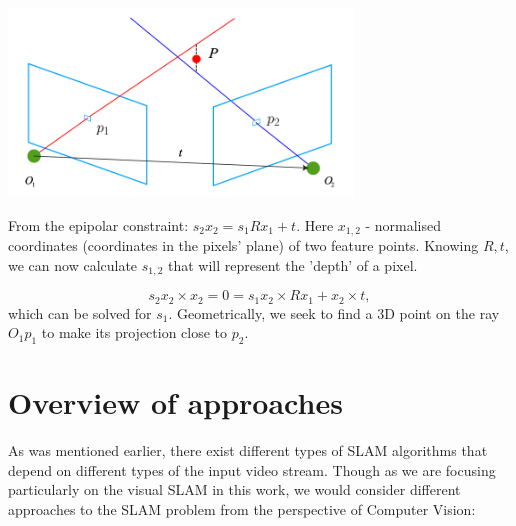 \begin{center}
    \includegraphics[height=5cm]{triangulation.png}\\[1cm]
\end{center}

From the epipolar constraint: $s_{2} x_{2} = s_{1} R x_{1} + t$. Here $x_{1, 2}$ - normalised coordinates (coordinates in the pixels' plane) of two feature points. Knowing $R, t$, we can now calculate $s_{1, 2}$ that will represent the 'depth' of a pixel. 

\begin{equation}
    s_{2} x_{2} \times x_{2} = 0 = s_{1} x_{2} \times R x_{1} + x_{2} \times t,
\end{equation}
which can be solved for $s_{1}$. Geometrically, we seek to find a 3D point on the ray $O_{1}p_{1}$ to make its projection close to $p_{2}$.

\section{Overview of approaches}
As was mentioned earlier, there exist different types of SLAM algorithms that depend on different types of the input video stream. Though as we are focusing particularly on the visual SLAM in this work, we would consider different approaches to the SLAM problem from the perspective of Computer Vision:

